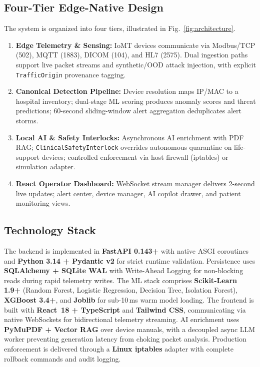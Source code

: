 \documentclass[conference]{IEEEtran}
\begin{document}
\subsection{Four-Tier Edge-Native Design}
The system is organized into four tiers, illustrated in Fig.~\ref{fig:architecture}.
\begin{enumerate}
    \item \textbf{Edge Telemetry \& Sensing:} IoMT devices communicate via Modbus/TCP (502), MQTT (1883), DICOM (104), and HL7 (2575). Dual ingestion paths support live packet streams and synthetic/OOD attack injection, with explicit \texttt{TrafficOrigin} provenance tagging.
    \item \textbf{Canonical Detection Pipeline:} Device resolution maps IP/MAC to a hospital inventory; dual-stage ML scoring produces anomaly scores and threat predictions; 60-second sliding-window alert aggregation deduplicates alert storms.
    \item \textbf{Local AI \& Safety Interlocks:} Asynchronous AI enrichment with PDF RAG; \texttt{ClinicalSafetyInterlock} overrides autonomous quarantine on life-support devices; controlled enforcement via host firewall (iptables) or simulation adapter.
    \item \textbf{React Operator Dashboard:} WebSocket stream manager delivers 2-second live updates; alert center, device manager, AI copilot drawer, and patient monitoring views.
\end{enumerate}

\subsection{Technology Stack}
The backend is implemented in \textbf{FastAPI 0.143+} with native ASGI coroutines and \textbf{Python 3.14 + Pydantic v2} for strict runtime validation. Persistence uses \textbf{SQLAlchemy + SQLite WAL} with Write-Ahead Logging for non-blocking reads during rapid telemetry writes. The ML stack comprises \textbf{Scikit-Learn 1.9+} (Random Forest, Logistic Regression, Decision Tree, Isolation Forest), \textbf{XGBoost 3.4+}, and \textbf{Joblib} for sub-10\,ms warm model loading. The frontend is built with \textbf{React~18 + TypeScript} and \textbf{Tailwind CSS}, communicating via native WebSockets for bidirectional telemetry streaming. AI enrichment uses \textbf{PyMuPDF + Vector RAG} over device manuals, with a decoupled async LLM worker preventing generation latency from choking packet analysis. Production enforcement is delivered through a \textbf{Linux iptables} adapter with complete rollback commands and audit logging.
\end{document}
